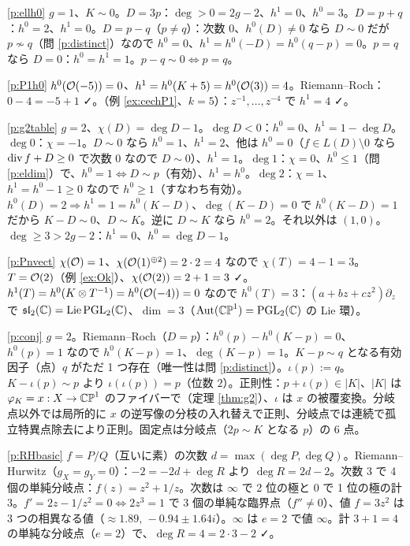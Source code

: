 \begin{sol}{\ref{p:ellh0}}
$g=1$、$K\sim0$。$D=3p$：$\deg>0=2g-2$、$h^1=0$、$h^0=3$。$D=p+q$：$h^0=2$、$h^1=0$。$D=p-q$（$p\neq q$）：次数 $0$、$h^0(D)\ne0$ なら $D\sim0$ だが $p\not\sim q$（問 \ref{p:distinct}）なので $h^0=0$、$h^1=h^0(-D)=h^0(q-p)=0$。$p=q$ なら $D=0$：$h^0=h^1=1$。$p-q\sim0\iff p=q$。
\end{sol}
\begin{sol}{\ref{p:P1h0}}
$h^0(\mathcal O(-5))=0$、$h^1=h^0(K+5)=h^0(\mathcal O(3))=4$。Riemann--Roch：$0-4=-5+1$ ✓。\Cech{}（例 \ref{ex:cechP1}、$k=5$）：$z^{-1},\dots,z^{-4}$ で $h^1=4$ ✓。
\end{sol}
\begin{sol}{\ref{p:g2table}}
$g=2$、$\chi(D)=\deg D-1$。$\deg D<0$：$h^0=0$、$h^1=1-\deg D$。$\deg0$：$\chi=-1$。$D\sim0$ なら $h^0=1$、$h^1=2$、他は $h^0=0$（$f\in L(D)\setminus0$ なら $\operatorname{div} f+D\ge0$ で次数 $0$ なので $D\sim0$）、$h^1=1$。$\deg1$：$\chi=0$、$h^0\le1$（問 \ref{p:eldim}）で、$h^0=1\iff D\sim p$（有効）、$h^1=h^0$。$\deg2$：$\chi=1$、$h^1=h^0-1\ge0$ なので $h^0\ge1$（すなわち有効）。$h^0(D)=2\Rightarrow h^1=1=h^0(K-D)$、$\deg(K-D)=0$ で $h^0(K-D)=1$ だから $K-D\sim0$、$D\sim K$。逆に $D\sim K$ なら $h^0=2$。それ以外は $(1,0)$。$\deg\ge3>2g-2$：$h^1=0$、$h^0=\deg D-1$。
\end{sol}
\begin{sol}{\ref{p:Pnvect}}
$\chi(\mathcal O)=1$、$\chi(\mathcal O(1)^{\oplus2})=2\cdot2=4$ なので $\chi(T)=4-1=3$。$T=\mathcal O(2)$（例 \ref{ex:Ok}）、$\chi(\mathcal O(2))=2+1=3$ ✓。$h^1(T)=h^0(K\otimes T^{-1})=h^0(\mathcal O(-4))=0$ なので $h^0(T)=3$：$(a+bz+cz^2)\partial_z$ で $\mathfrak{sl}_2(\mathbb C)=\mathrm{Lie}\,\mathrm{PGL}_2(\mathbb C)$、$\dim=3$（$\operatorname{Aut}(\mathbb{CP}^1)=\mathrm{PGL}_2(\mathbb C)$ の Lie 環）。
\end{sol}
\begin{sol}{\ref{p:conj}}
$g=2$。Riemann--Roch（$D=p$）：$h^0(p)-h^0(K-p)=0$、$h^0(p)=1$ なので $h^0(K-p)=1$、$\deg(K-p)=1$。$K-p\sim q$ となる有効因子（点）$q$ がただ 1 つ存在（唯一性は問 \ref{p:distinct}）。$\iota(p):=q$。$K-\iota(p)\sim p$ より $\iota(\iota(p))=p$（位数 $2$）。正則性：$p+\iota(p)\in|K|$、$|K|$ は $\varphi_K=x:X\to\mathbb{CP}^1$ のファイバーで（定理 \ref{thm:g2}）、$\iota$ は $x$ の被覆変換。分岐点以外では局所的に $x$ の逆写像の分枝の入れ替えで正則、分岐点では連続で孤立特異点除去により正則。固定点は分岐点（$2p\sim K$ となる $p$）の 6 点。
\end{sol}
\begin{sol}{\ref{p:RHbasic}}
$f=P/Q$（互いに素）の次数 $d=\max(\deg P,\deg Q)$。Riemann--Hurwitz（$g_X=g_Y=0$）：$-2=-2d+\deg R$ より $\deg R=2d-2$。次数 $3$ で 4 個の単純分岐点：$f(z)=z^2+1/z$。次数は $\infty$ で 2 位の極と $0$ で 1 位の極の計 $3$。$f'=2z-1/z^2=0\iff2z^3=1$ で 3 個の単純な臨界点（$f''\neq0$）、値 $f=3z^2$ は 3 つの相異なる値（$\approx1.89,\,-0.94\pm1.64i$）。$\infty$ は $e=2$ で値 $\infty$。計 $3+1=4$ の単純な分岐点（$e=2$）で、$\deg R=4=2\cdot3-2$ ✓。
\end{sol}
